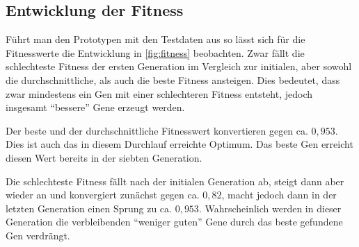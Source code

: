 
\subsection{Entwicklung der Fitness}

Führt man den Prototypen mit den Testdaten aus so lässt sich für die Fitnesswerte die Entwicklung in \autoref{fig:fitness} beobachten.
Zwar fällt die schlechteste Fitness der ersten Generation im Vergleich zur initialen,
aber sowohl die durchschnittliche, als auch die beste Fitness ansteigen.
Dies bedeutet, dass zwar mindestens ein Gen mit einer schlechteren Fitness entsteht,
jedoch insgesamt \enquote{bessere} Gene erzeugt werden.

Der beste und der durchschnittliche Fitnesswert konvertieren gegen ca. $0,953$.
Dies ist auch das in diesem Durchlauf erreichte Optimum.
Das beste Gen erreicht diesen Wert bereits in der siebten Generation.

Die schlechteste Fitness fällt nach der initialen Generation ab,
steigt dann aber wieder an und konvergiert zunächst gegen ca. $0,82$,
macht jedoch dann in der letzten Generation einen Sprung zu ca. $0,953$.
Wahrscheinlich werden in dieser Generation die verbleibenden \enquote{weniger guten} Gene durch das beste gefundene Gen verdrängt.

